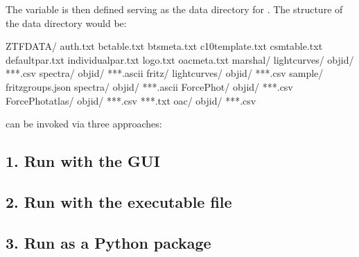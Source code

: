 \documentclass[letterpaper,10pt,english]{sphinxmanual}
\begin{document}
The variable  is then defined serving as the data directory for . The structure of the data directory would be:

\begin{sphinxVerbatim}[commandchars=\\\{\}]
ZTFDATA/
   auth.txt
   bc\PYGZus{}table.txt
   bts\PYGZus{}meta.txt
   c10\PYGZus{}template.txt
   csm\PYGZus{}table.txt
   default\PYGZus{}par.txt
   individual\PYGZus{}par.txt
   logo.txt
   oac\PYGZus{}meta.txt
   marshal/
      lightcurves/
         objid/
            ***.csv
      spectra/
         objid/
            ***.ascii
   fritz/
      lightcurves/
         objid/
            ***.csv
      sample/
         fritz\PYGZus{}groups.json
      spectra/
         objid/
            ***.ascii
   ForcePhot/
      objid/
         ***.csv
   ForcePhot\PYGZus{}atlas/
      objid/
         ***.csv
         ***.txt
   oac/
      objid/
         ***.csv
\end{sphinxVerbatim}

 can be invoked via three approaches:


\subsection{1. Run with the GUI}
\label{\detokenize{tutorial:run-with-the-gui}}

\subsection{2. Run with the executable file}
\label{\detokenize{tutorial:run-with-the-executable-file}}

\subsection{3. Run as a Python package}
\label{\detokenize{tutorial:run-as-a-python-package}}
\begin{DUlineblock}{0em}
\item[] 
\item[] 
\end{DUlineblock}
\end{document}
